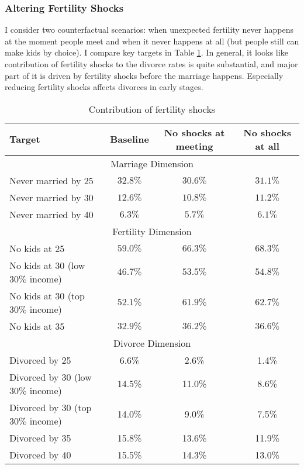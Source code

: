 \documentclass[12pt,letter]{article}
\begin{document}
\subsubsection{Altering Fertility Shocks}
I consider two counterfactual scenarios: when unexpected fertility never happens at the moment people meet and when it never happens at all (but people still can make kids by choice). I compare key targets in Table \ref{cf-shocks}. In general, it looks like contribution of fertility shocks to the divorce rates is quite substantial, and major part of it is driven by fertility shocks before the marriage happens. Especially reducing fertility shocks affects divorces in early stages.
\begin{table}
\begin{center}
\begin{tabular}{|l|c|c|c|}\hline
Target & Baseline & No shocks at meeting & No shocks at all \\\hline
\multicolumn{4}{|c|}{Marriage Dimension} \\\hline
Never married by 25  & $32.8\%$ & $30.6\%$ & $31.1\%$  \\
Never married by 30 & $12.6\%$ & $10.8\%$ & $11.2\%$  \\
Never married by 40 & $6.3\%$ & $5.7\%$ & $6.1\%$  \\\hline
\multicolumn{4}{|c|}{Fertility Dimension} \\\hline
No kids at 25 & $59.0\%$ & $66.3\%$ & $68.3\%$ \\
No kids at 30 (low $30\%$ income) & $46.7\%$  &   $53.5\%$ & $54.8\%$ \\
No kids at 30 (top $30\%$ income) & $52.1\%$  &   $61.9\%$ & $62.7\%$ \\
No kids at 35  & $32.9\%$  &   $36.2\%$ & $36.6\%$ \\\hline
\multicolumn{4}{|c|}{Divorce Dimension} \\\hline
Divorced by 25 & 6.6\%   &  2.6\% & 1.4\% \\
Divorced by 30 (low $30\%$ income)  & 14.5\% &     11.0\% & 8.6\% \\
Divorced by 30 (top $30\%$ income)  & 14.0\% &     9.0\% & 7.5\% \\
Divorced by 35  & 15.8\% &    13.6\% & 11.9\% \\
Divorced by 40  & 15.5\% &    14.3\% & 13.0\% \\\hline
\end{tabular}
\caption{Contribution of fertility shocks \label{cf-shocks}}
\end{center}
\end{table}
\end{document}
